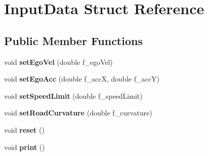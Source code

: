 \hypertarget{struct_input_data}{}\section{Input\+Data Struct Reference}
\label{struct_input_data}
\subsection*{Public Member Functions}
\begin{DoxyCompactItemize}
\item 
\mbox{\label{struct_input_data_abd957eae396e2aeb38a12091e9a29ff4}} 
void {\bfseries set\+Ego\+Vel} (double f\+\_\+ego\+Vel)
\item 
\mbox{\label{struct_input_data_a8e045b6febe42fd0df894a456610559a}} 
void {\bfseries set\+Ego\+Acc} (double f\+\_\+accX, double f\+\_\+accY)
\item 
\mbox{\label{struct_input_data_aa7093953ad8c0af525bcb50fd461bdb0}} 
void {\bfseries set\+Speed\+Limit} (double f\+\_\+speed\+Limit)
\item 
\mbox{\label{struct_input_data_aa0e28a3584d42af16f9f24fac3111101}} 
void {\bfseries set\+Road\+Curvature} (double f\+\_\+curvature)
\item 
\mbox{\label{struct_input_data_a0ea9219b0dec794e12b2593a5ce8d519}} 
void {\bfseries reset} ()
\item 
\mbox{\label{struct_input_data_a67082e3b40be9b7cbc4ec789b44a2c47}} 
void {\bfseries print} ()
\end{DoxyCompactItemize}

